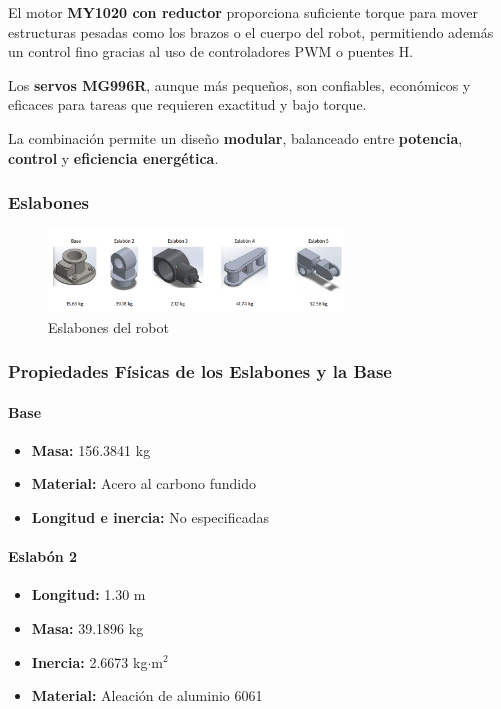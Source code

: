 El motor \textbf{MY1020 con reductor} proporciona suficiente torque para mover estructuras pesadas como los brazos o el cuerpo del robot, permitiendo además un control fino gracias al uso de controladores PWM o puentes H.

Los \textbf{servos MG996R}, aunque más pequeños, son confiables, económicos y eficaces para tareas que requieren exactitud y bajo torque.

La combinación permite un diseño \textbf{modular}, balanceado entre \textbf{potencia}, \textbf{control} y \textbf{eficiencia energética}.

\subsubsection{Eslabones} \label{subsubsec:eslabones}
	\begin{figure}[H]
	\centering
	\includegraphics[width=0.7\textwidth]{img/Eslabones.png}
	\caption{Eslabones del robot}
	\label{fig:Eslabones}
\end{figure}

\subsubsection{Propiedades Físicas de los Eslabones y la Base}
\paragraph{Base}
\begin{itemize}
	\item \textbf{Masa:} 156.3841 kg
	\item \textbf{Material:} Acero al carbono fundido
	\item \textbf{Longitud e inercia:} No especificadas
\end{itemize}
\paragraph{Eslabón 2}
\begin{itemize}
	\item \textbf{Longitud:} 1.30 m
	\item \textbf{Masa:} 39.1896 kg
	\item \textbf{Inercia:} 2.6673 kg$\cdot$m$^2$
	\item \textbf{Material:} Aleación de aluminio 6061
\end{itemize}

